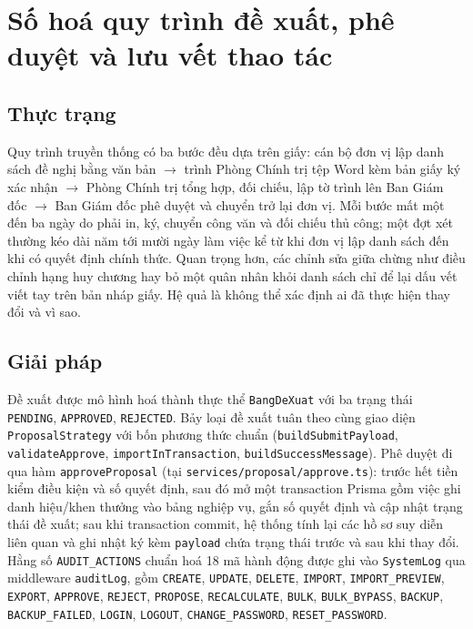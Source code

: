 \documentclass[../DoAn.tex]{subfiles}
\begin{document}
\section{Số hoá quy trình đề xuất, phê duyệt và lưu vết thao tác}
\label{section:5.2}

\subsection*{Thực trạng}
Quy trình truyền thống có ba bước đều dựa trên giấy: cán bộ đơn vị lập danh sách đề nghị bằng văn bản $\rightarrow$ trình Phòng Chính trị tệp Word kèm bản giấy ký xác nhận $\rightarrow$ Phòng Chính trị tổng hợp, đối chiếu, lập tờ trình lên Ban Giám đốc $\rightarrow$ Ban Giám đốc phê duyệt và chuyển trở lại đơn vị. Mỗi bước mất một đến ba ngày do phải in, ký, chuyển công văn và đối chiếu thủ công; một đợt xét thường kéo dài năm tới mười ngày làm việc kể từ khi đơn vị lập danh sách đến khi có quyết định chính thức. Quan trọng hơn, các chỉnh sửa giữa chừng như điều chỉnh hạng huy chương hay bỏ một quân nhân khỏi danh sách chỉ để lại dấu vết viết tay trên bản nháp giấy. Hệ quả là không thể xác định ai đã thực hiện thay đổi và vì sao.

\subsection*{Giải pháp}
Đề xuất được mô hình hoá thành thực thể \texttt{BangDeXuat} với ba trạng thái \texttt{PENDING}, \texttt{APPROVED}, \texttt{REJECTED}. Bảy loại đề xuất tuân theo cùng giao diện \texttt{ProposalStrategy} với bốn phương thức chuẩn (\texttt{buildSubmitPayload}, \texttt{validateApprove}, \texttt{importInTransaction}, \texttt{buildSuccessMessage}). Phê duyệt đi qua hàm \texttt{approveProposal} (tại \texttt{services/proposal/approve.ts}): trước hết tiền kiểm điều kiện và số quyết định, sau đó mở một transaction Prisma gồm việc ghi danh hiệu/khen thưởng vào bảng nghiệp vụ, gắn số quyết định và cập nhật trạng thái đề xuất; sau khi transaction commit, hệ thống tính lại các hồ sơ suy diễn liên quan và ghi nhật ký kèm \texttt{payload} chứa trạng thái trước và sau khi thay đổi. Hằng số \texttt{AUDIT\_ACTIONS} chuẩn hoá 18 mã hành động được ghi vào \texttt{SystemLog} qua middleware \texttt{auditLog}, gồm \texttt{CREATE}, \texttt{UPDATE}, \texttt{DELETE}, \texttt{IMPORT}, \texttt{IMPORT\_PREVIEW}, \texttt{EXPORT}, \texttt{APPROVE}, \texttt{REJECT}, \texttt{PROPOSE}, \texttt{RECALCULATE}, \texttt{BULK}, \texttt{BULK\_BYPASS}, \texttt{BACKUP}, \texttt{BACKUP\_FAILED}, \texttt{LOGIN}, \texttt{LOGOUT}, \texttt{CHANGE\_PASSWORD}, \texttt{RESET\_PASSWORD}.
\end{document}
